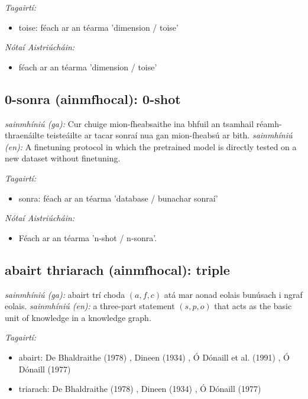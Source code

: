 \documentclass{article}
\begin{document}
 \noindent \textit{Tagairtí:}
\begin{itemize}
	\item toise: féach ar an téarma 'dimension / toise'
\end{itemize}

 \noindent \textit{Nótaí Aistriúcháin:}
\begin{itemize}
	\item féach ar an téarma 'dimension / toise'
\end{itemize}


\subsection*{0-sonra (ainmfhocal): 0-shot} 
 \noindent \textit{sainmhíniú (ga):} Cur chuige mion-fheabsaithe ina bhfuil an tsamhail réamh-thraenáilte teisteáilte ar tacar sonraí nua gan mion-fheabsú ar bith.
\newline\newline
 \noindent \textit{sainmhíniú (en):} A finetuning protocol in which the pretrained model is directly tested on a new dataset without finetuning.
\newline

 \noindent \textit{Tagairtí:}
\begin{itemize}
	\item sonra: féach ar an téarma 'database / bunachar sonraí'
\end{itemize}

 \noindent \textit{Nótaí Aistriúcháin:}
\begin{itemize}
	\item Féach ar an téarma 'n-shot / n-sonra'.
\end{itemize}


\subsection*{abairt thriarach (ainmfhocal): triple} 
 \noindent \textit{sainmhíniú (ga):} abairt trí choda $(a,f,c)$ atá mar aonad eolais bunúsach i ngraf eolais.
\newline\newline
 \noindent \textit{sainmhíniú (en):} a three-part statement $(s,p,o)$ that acts as the basic unit of knowledge in a knowledge graph.
\newline

 \noindent \textit{Tagairtí:}
\begin{itemize}
	\item abairt: De Bhaldraithe (1978) \cite{de-bhaldraithe}, Dineen (1934) \cite{dineen}, Ó Dónaill et al. (1991) \cite{focloir-beag}, Ó Dónaill (1977) \cite{odonaill}
	\item triarach: De Bhaldraithe (1978) \cite{de-bhaldraithe}, Dineen (1934) \cite{dineen}, Ó Dónaill (1977) \cite{odonaill}
\end{itemize}
\end{document}
